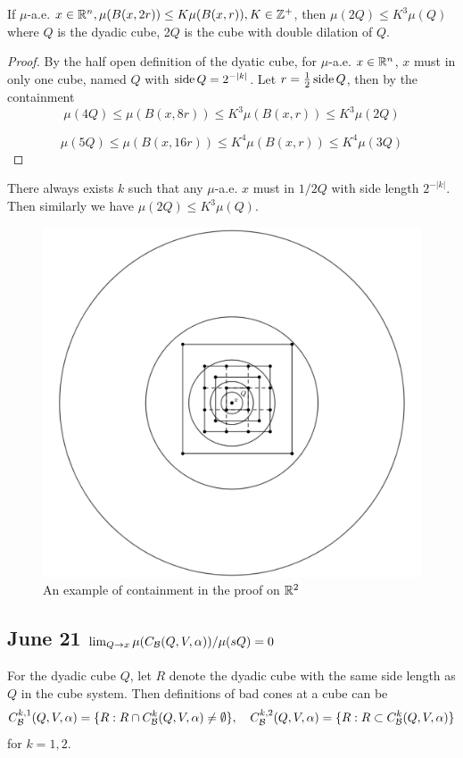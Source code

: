 \begin{lemma}
    If $\mu$-a.e. $x\in \mathbb{R}^n, \mu(B(x, 2r))\leq K\mu(B(x,r)), K\in\mathbb{Z}^+$, then
    $\mu(2Q)\leq K^3 \mu(Q)$ where $Q$ is the dyadic cube, 2$Q$ is the cube with double dilation of $Q$. 
\end{lemma}
\begin{proof} By the half open definition of the dyatic cube, for $\mu$-a.e. $x\in \mathbb{R}^n$, $x$ must in only one cube, named $Q$ with $\operatorname{side} Q = 2^{-|k|}$. Let $r = \frac{1}{2}\operatorname{side} Q$, then by the containment
    \begin{equation}
        \mu(4Q)\leq \mu(B(x, 8r))\leq K^3 \mu(B(x, r)) \leq K^3 \mu(2Q)
    \end{equation}

    \begin{equation}
        \mu(5Q) \leq \mu(B(x, 16r)) \leq K^4\mu(B(x,r))\leq K^4\mu(3Q)
    \end{equation}
\end{proof}
There always exists $k$ such that any $\mu$-a.e. $x$ must in $1/2 Q$ with side length $2^{-|k|}$. Then similarly we have $\mu(2Q)\leq K^3\mu(Q)$.

\begin{figure}[H]
    \centering
    \includegraphics[width=.66\textwidth]{images/doubleMucube.png}
    \caption{An example of containment in the proof on $\mathbb{R}^2$}
\end{figure}

\newpage
\subsection{June 21 \texorpdfstring{$\lim_{Q\rightarrow x}\mu(C_\mathcal B(Q, V, \alpha))/\mu(sQ) = 0$}{Lg}}

\begin{definition} For the dyadic cube $Q$, let $R$ denote the dyadic cube with the same side length as $Q$ in the cube system. Then definitions of bad cones at a cube can be 
    \begin{equation*}
        C_\mathcal B^{k,1}(Q, V, \alpha) = \{R: R\cap C_\mathcal B^k(Q, V, \alpha) \neq \emptyset\}, \quad
        C_\mathcal B^{k,2}(Q, V, \alpha) = \{R: R\subset C_\mathcal B^k(Q, V, \alpha)\} 
    \end{equation*}
for $k=1,2$.
\end{definition}




